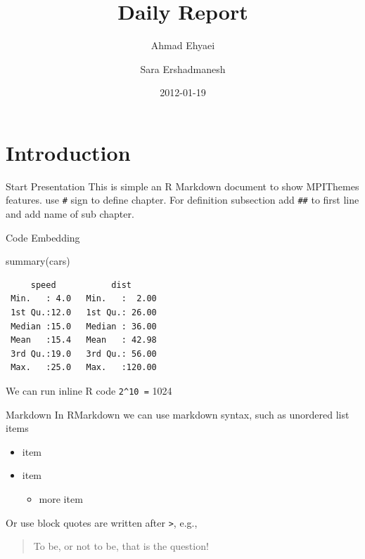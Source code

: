 \documentclass[10pt,ignorenonframetext,]{beamer}
\title{Daily Report}
\author{Ahmad Ehyaei \and Sara Ershadmanesh}
\date{2012-01-19}
\newenvironment{Shaded}{\begin{snugshade}}{\end{snugshade}}
\newcommand{\FunctionTok}[1]{\textcolor[rgb]{0.00,0.00,0.00}{#1}}
\newcommand{\NormalTok}[1]{#1}
\providecommand{\tightlist}{%
  \setlength{\itemsep}{0pt}\setlength{\parskip}{0pt}}
\begin{document}
\frame{\titlepage}

\hypertarget{introduction}{%
\section{Introduction}\label{introduction}}

\begin{frame}[fragile]{Start Presentation}
\protect\hypertarget{start-presentation}{}
This is simple an R Markdown document to show MPIThemes features. use
\texttt{\#} sign to define chapter. For definition subsection add
\texttt{\#\#} to first line and add name of sub chapter.
\end{frame}

\begin{frame}[fragile]{Code Embedding}
\protect\hypertarget{code-embedding}{}
\begin{Shaded}
\begin{Highlighting}[]
\FunctionTok{summary}\NormalTok{(cars)}
\end{Highlighting}
\end{Shaded}

\begin{verbatim}
     speed           dist       
 Min.   : 4.0   Min.   :  2.00  
 1st Qu.:12.0   1st Qu.: 26.00  
 Median :15.0   Median : 36.00  
 Mean   :15.4   Mean   : 42.98  
 3rd Qu.:19.0   3rd Qu.: 56.00  
 Max.   :25.0   Max.   :120.00  
\end{verbatim}

We can run inline R code \texttt{2\^{}10\ =} 1024
\end{frame}

\begin{frame}[fragile]{Markdown}
\protect\hypertarget{markdown}{}
In RMarkdown we can use markdown syntax, such as unordered list items

\begin{itemize}
\tightlist
\item
  item
\item
  item

  \begin{itemize}
  \tightlist
  \item
    more item
  \end{itemize}
\end{itemize}

Or use block quotes are written after \texttt{\textgreater{}}, e.g.,

\begin{quote}
To be, or not to be, that is the question!
\end{quote}
\end{frame}
\end{document}
